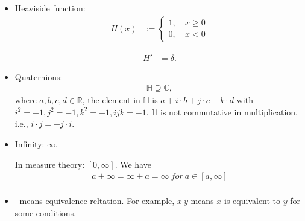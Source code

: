 \documentclass[../../note.tex]{subfiles}
\begin{document}
\begin{itemize}
    \item Heaviside function: 
    \begin{align}
        H(x)
        &:= 
        \left\{
            \begin{array}{lc}
                1, &~x\geq 0 \\
                0, &~x < 0
            \end{array}
        \right.
    \end{align}
    \begin{property}
        \begin{align}
            H'
            &= \delta.
        \end{align}
    \end{property}
    \item Quaternions: 
    \begin{align}
        \mathbb{H} \supseteq \mathbb{C},
    \end{align}
    where $a,b,c,d \in \mathbb{R}$, the element in $\mathbb{H}$ is $a+i\cdot b+j\cdot c+k\cdot d$ with $i^2=-1, j^2=-1,k^2=-1, ijk = -1$. $\mathbb{H}$ is not commutative in multiplication, i.e., $i\cdot j = - j \cdot i$.
    \item Infinity: $\infty$.
    \begin{example}
        In measure theory: $[0,\infty]$. We have
        \begin{align}
            a+\infty = \infty+a=\infty~for~a\in [a,\infty] \\      
        \end{align}
    \end{example}
    \item $~$ means equivalence reltation. For example, $x ~ y$ means $x$ is equivalent to $y$ for some conditions.

\end{itemize}
\end{document}
